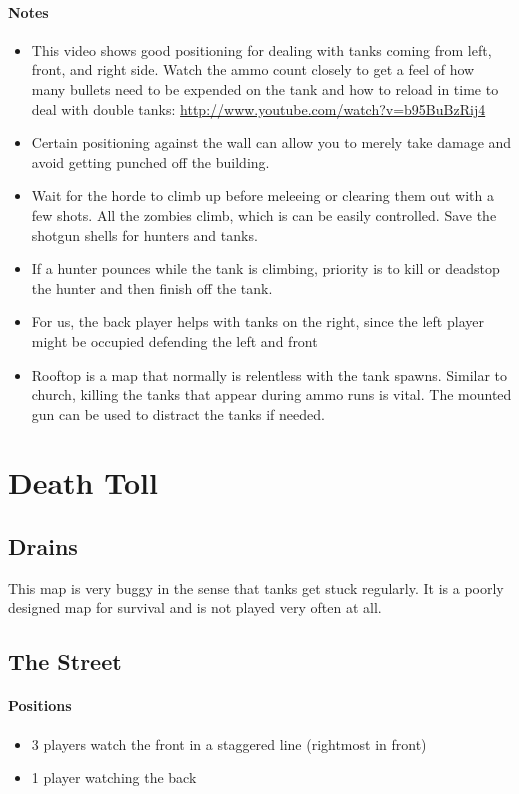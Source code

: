 \paragraph{Notes}
\begin{itemize}
\item This video shows good positioning for dealing with tanks coming from left, front, and right side. Watch the ammo count closely to get a feel of how many bullets need to be expended on the tank and how to reload in time to deal with double tanks: \url{http://www.youtube.com/watch?v=b95BuBzRij4}
\item Certain positioning against the wall can allow you to merely take damage and avoid getting punched off the building.
\item Wait for the horde to climb up before meleeing or clearing them out with a few shots. All the zombies climb, which is can be easily controlled. Save the shotgun shells for hunters and tanks.
\item If a hunter pounces while the tank is climbing, priority is to kill or deadstop the hunter and then finish off the tank.
\item For us, the back player helps with tanks on the right, since the left player might be occupied defending the left and front
\item Rooftop is a map that normally is relentless with the tank spawns. Similar to church, killing the tanks that appear during ammo runs is vital. The mounted gun can be used to distract the tanks if needed.
\end{itemize}

\section{Death Toll}

\subsection{Drains}
This map is very buggy in the sense that tanks get stuck regularly. It is a poorly designed map for survival and is not played very often at all.

\subsection{The Street}
\paragraph{Positions}
\begin{itemize}
\item 3 players watch the front in a staggered line (rightmost in front)
\item 1 player watching the back
\end{itemize}

